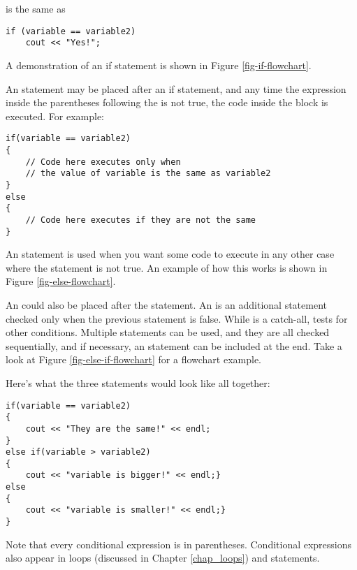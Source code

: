 \noindent is the same as

\begin{lstlisting}
if (variable == variable2)
	cout << "Yes!";
\end{lstlisting}

A demonstration of an if statement is shown in Figure \ref{fig-if-flowchart}.


An  statement may be placed after an if statement, and any time the expression inside the parentheses following the  is not true, the code inside the  block is executed. 
For example:

\begin{lstlisting}
if(variable == variable2)
{
	// Code here executes only when
	// the value of variable is the same as variable2
}
else
{
	// Code here executes if they are not the same
}
\end{lstlisting}

An  statement is used when you want some code to execute in any other case where the  statement is not true. 
An example of how this works is shown in Figure \ref{fig-else-flowchart}.


An  could also be placed after the  statement. 
An  is an additional  statement checked only when the previous  statement is false. 
While  is a catch-all,  tests for other conditions. 
Multiple  statements can be used, and they are all checked sequentially, and if necessary, an  statement can be included at the end. 
Take a look at Figure \ref{fig-else-if-flowchart} for a flowchart example.


Here's what the three statements would look like all together:

\begin{lstlisting}
if(variable == variable2)
{
	cout << "They are the same!" << endl;
}
else if(variable > variable2)
{
	cout << "variable is bigger!" << endl;}
else
{
	cout << "variable is smaller!" << endl;}
}
\end{lstlisting}

Note that every conditional expression is in parentheses. 
Conditional expressions also appear in loops (discussed in Chapter \ref{chap_loops}) and  statements.

